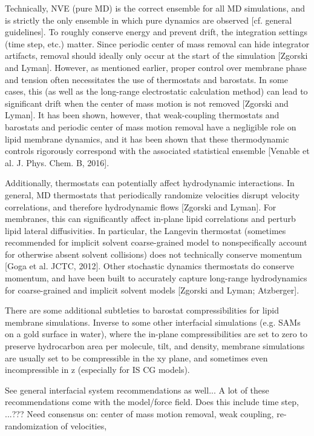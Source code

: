 \documentclass[9pt,bestpractices]{livecoms}
\begin{document}
Technically, NVE (pure MD) is the correct ensemble for all MD simulations, and is strictly the only ensemble in which pure dynamics are observed [cf. general guidelines].
To roughly conserve energy and prevent drift, the integration settings (time step, etc.) matter.
Since periodic center of mass removal can hide integrator artifacts, removal should ideally only occur at the start of the simulation [Zgorski and Lyman].
However, as mentioned earlier, proper control over membrane phase and tension often necessitates the use of thermostats and barostats.
In some cases, this (as well as the long-range electrostatic calculation method) can lead to significant drift when the center of mass motion is not removed [Zgorski and Lyman].
It has been shown, however, that weak-coupling thermostats and barostats and periodic center of mass motion removal have a negligible role on lipid membrane dynamics, and it has been shown that these thermodynamic controls rigorously correspond with the associated statistical ensemble [Venable et al. J. Phys. Chem. B, 2016].

Additionally, thermostats can potentially affect hydrodynamic interactions.
In general, MD thermostats that periodically randomize velocities disrupt velocity correlations, and therefore hydrodynamic flows [Zgorski and Lyman].
For membranes, this can significantly affect in-plane lipid correlations and perturb lipid lateral diffusivities.
In particular, the Langevin thermostat (sometimes recommended for implicit solvent coarse-grained model to nonspecifically account for otherwise absent solvent collisions) does not technically conserve momentum [Goga et al. JCTC, 2012].
Other stochastic dynamics thermostats do conserve momentum, and have been built to accurately capture long-range hydrodynamics for coarse-grained and implicit solvent models [Zgorski and Lyman; Atzberger].

There are some additional subtleties to barostat compressibilities for lipid membrane simulations.
Inverse to some other interfacial simulations (e.g. SAMs on a gold surface in water), where the in-plane compressibilities are set to zero to preserve hydrocarbon area per molecule, tilt, and density, membrane simulations are usually set to be compressible in the xy plane, and sometimes even incompressible in z (especially for IS CG models).

See general interfacial system recommendations as well...
A lot of these recommendations come with the model/force field.
Does this include time step, ...???
Need consensus on: center of mass motion removal, weak coupling, re-randomization of velocities, 
\end{document}
